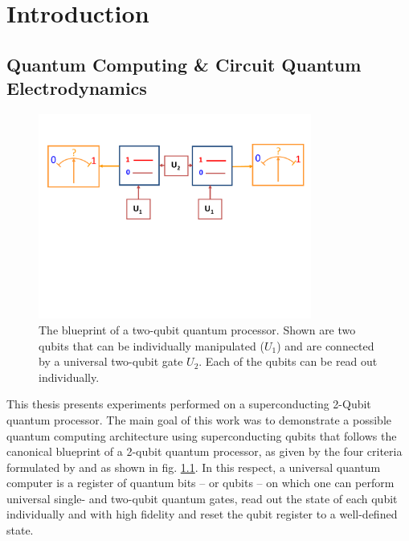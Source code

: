 \chapter{Introduction}


\section{Quantum Computing \& Circuit Quantum Electrodynamics}

\begin{figure}
	\centering
		\includegraphics[width=0.8\textwidth]{./material/papers/grover/submission1/Fig1}
	\caption[Blueprint of a two-qubit quantum processor]{The blueprint of a two-qubit quantum processor. Shown are two qubits that can be individually manipulated ($U_1$) and are connected by a universal two-qubit gate $U_2$. Each of the qubits can be read out individually.}
	\label{fig:qubit_processor_blueprint}
\end{figure}

This thesis presents experiments performed on a superconducting 2-Qubit quantum processor. The main goal of this work was to demonstrate a possible quantum computing architecture using superconducting qubits that follows the canonical blueprint of a 2-qubit quantum processor, as given by the four criteria formulated by \cite{divincenzo_physical_2000} and as shown in fig. \ref{fig:qubit_processor_blueprint}. In this respect, a universal quantum computer is a register of quantum bits -- or qubits -- on which one can perform universal single- and two-qubit quantum gates, read out the state of each qubit individually and with high fidelity and reset the qubit register to a well-defined state.

